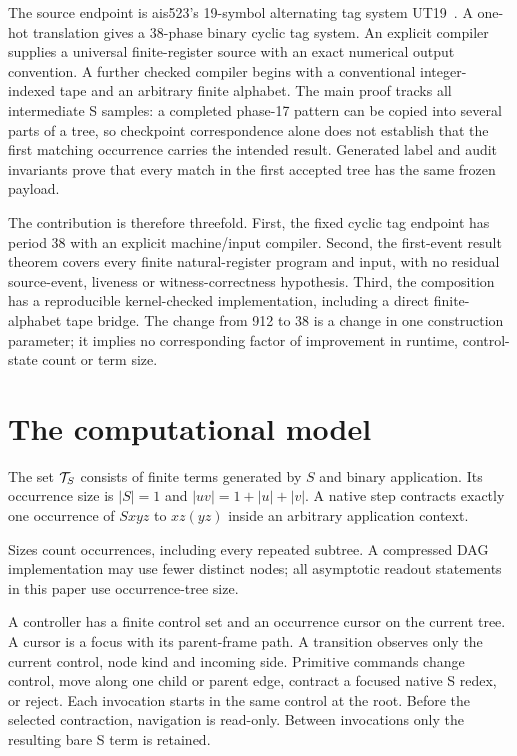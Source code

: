 The source endpoint is ais523's 19-symbol alternating tag system UT19~\cite{ut19}.
A one-hot translation gives a 38-phase binary cyclic tag system. An explicit
compiler supplies a universal finite-register source with an exact numerical
output convention. A further checked compiler begins with a conventional
integer-indexed tape and an arbitrary finite alphabet. The main proof tracks
all intermediate S samples: a completed phase-17 pattern can be copied into
several parts of a tree, so checkpoint correspondence alone does not establish
that the first matching occurrence carries the intended result. Generated
label and audit invariants prove that every match in the first accepted tree
has the same frozen payload.

The contribution is therefore threefold. First, the fixed cyclic tag endpoint
has period 38 with an explicit machine/input compiler. Second, the first-event
result theorem covers every finite natural-register program and input, with
no residual source-event, liveness or witness-correctness hypothesis. Third,
the composition has a reproducible kernel-checked implementation, including a
direct finite-alphabet tape bridge. The change from 912 to 38 is a change in
one construction parameter; it implies no corresponding factor of improvement
in runtime, control-state count or term size.

\section{The computational model}

\begin{definition}
The set $\mathcal{T}_{S}$ consists of finite terms generated by $S$ and binary
application. Its occurrence size is
$|S|=1$ and $|uv|=1+|u|+|v|$. A native step contracts exactly one occurrence
of $Sxyz$ to $xz(yz)$ inside an arbitrary application context.
\end{definition}

Sizes count occurrences, including every repeated subtree. A compressed DAG
implementation may use fewer distinct nodes; all asymptotic readout statements
in this paper use occurrence-tree size.

\begin{definition}
A controller has a finite control set and an occurrence cursor on the current
tree. A cursor is a focus with its parent-frame path. A transition observes
only the current control, node kind and incoming side. Primitive commands
change control, move along one child or parent edge, contract a focused native
S redex, or reject. Each invocation starts in the same control at the root.
Before the selected contraction, navigation is read-only. Between invocations
only the resulting bare S term is retained.
\end{definition}

